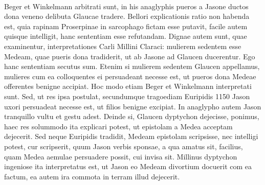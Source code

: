\documentclass[landscape, a4paper, 11pt, oneside, polutonikogreek, german]{article}
\begin{document}
\paragraph{}
Beger et Winkelmann arbitrati sunt, in his anaglyphis pueros a Jasone ductos dona veneno delibuta Glaucae tradere. Bellori explicationis ratio non habenda est, quia rapinam Proserpinae in sarcophago fictam esse putavit, facile autem quisque intelligit, hanc sententiam esse refutandam. Dignae autem sunt, quae examinentur, interpretationes Carli Millini Claraci: mulierem sedentem esse Medeam, quae pueris dona tradiderit, ut ab Jasone ad Glaucen ducerentur. Ego hanc sententiam secutus sum. Etenim si mulierem sedentem Glaucen appellamus, mulieres cum ea colloquentes ei persuadeant necesse est, ut pueros dona Medeae offerentes benigne accipiat. Hoc modo etiam Beger et Winkelmann interpretati sunt. Sed, ut res ipsa postulat, secundumque tragoediam Euripidis 1150 Jason uxori persuadeat necesse est, ut filios benigne excipiat. In anaglypho autem Jason tranquillo vultu et gestu adest. Deinde si, Glaucen dyptychon dejecisse, ponimus, haec res solummodo ita explicari potest, ut epistolam a Medea acceptam dejecerit. Sed neque Euripidis tradidit, Medeam epistolam scripsisse, nec intelligi potest, cur scripserit, quum Jason verbis sponsae, a qua amatus sit, facilius, quam Medea aemulae persuadere possit, cui invisa sit. Millinus dyptychon ingeniose ita interpretatus est, ut Jason eo Medeam divortium docuerit com ea factum, ea autem ira commota in terram illud dejecerit.
\end{document}
